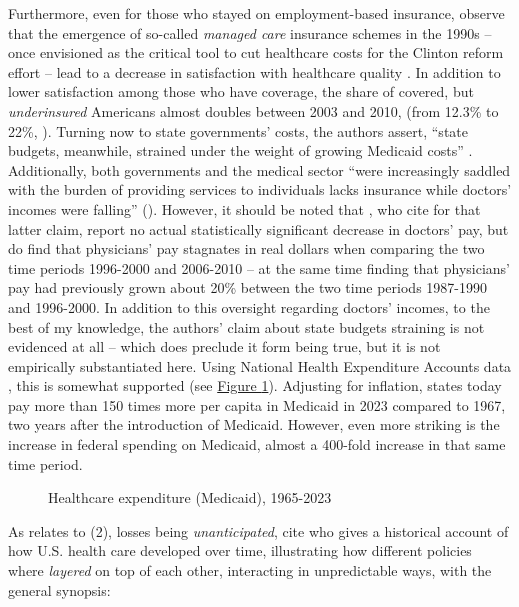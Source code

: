 \documentclass[11pt]{article}
\begin{document}
Furthermore, even for those who stayed on employment-based insurance, \textcite[][]{Jacobs2014} observe that the emergence of so-called \textit{managed care} insurance schemes in the 1990s -- once envisioned as the critical tool to cut healthcare costs for the Clinton reform effort -- lead to a decrease in satisfaction with healthcare quality \parencite[see][]{Thorpe1999}. In addition to lower satisfaction among those who have coverage, the share of covered, but \textit{underinsured} Americans almost doubles between 2003 and 2010, (from 12.3\% to 22\%, ). Turning now to state governments' costs, the authors assert, \enquote{state budgets, meanwhile, strained under the weight of growing Medicaid costs} \parencite[][p. 451]{Jacobs2014}. Additionally, both governments and the medical sector \enquote{were increasingly saddled with the burden of providing services to individuals lacks insurance while doctors' incomes were falling} (). However, it should be noted that \textcite[][]{Seabury2012}, who \textcite[][]{Jacobs2014} cite for that latter claim, report no actual statistically significant decrease in doctors' pay, but do find that physicians' pay stagnates in real dollars when comparing the two time periods 1996-2000 and 2006-2010 -- at the same time finding that physicians' pay had previously grown about 20\% between the two time periods 1987-1990 and 1996-2000. In addition to this oversight regarding doctors' incomes, to the best of my knowledge, the authors' claim about state budgets straining is not evidenced at all -- which does preclude it form being true, but it is not empirically substantiated here. Using National Health Expenditure Accounts data \parencite[][]{NHEA}, this is somewhat supported (see \hyperref[fig:expend_states]{Figure \ref*{fig:expend_states}}). Adjusting for inflation, states today pay more than 150 times more per capita in Medicaid in 2023 compared to 1967, two years after the introduction of Medicaid. However, even more striking is the increase in federal spending on Medicaid, almost a 400-fold increase in that same time period.

\begin{figure}[H]
  \sffamily
  \caption{Healthcare expenditure (Medicaid), 1965-2023}
  
  \label{fig:expend_states}
\end{figure}

As relates to (2), losses being \textit{unanticipated}, \textcite[][]{Jacobs2014} cite \textcite[][]{Hacker1998} who gives a historical account of how U.S. health care developed over time, illustrating how different policies where \textit{layered} on top of each other, interacting in unpredictable ways, with the general synopsis:
\end{document}
